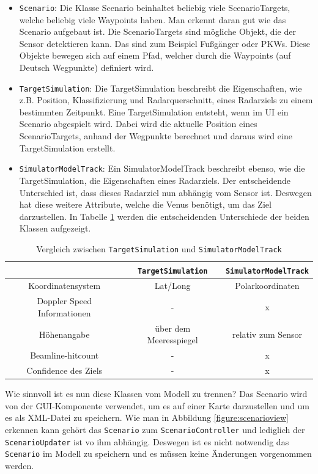 \begin{itemize}
    \item \texttt{Scenario}: Die Klasse Scenario beinhaltet beliebig viele ScenarioTargets, welche beliebig viele Waypoints haben. Man erkennt daran gut wie das Scenario aufgebaut ist. Die ScenarioTargets sind mögliche Objekt, die der Sensor detektieren kann. Das sind zum Beispiel Fußgänger oder PKWs. Diese Objekte bewegen sich auf einem Pfad, welcher durch die Waypoints (auf Deutsch Wegpunkte) definiert wird.
    \item \texttt{TargetSimulation}:  Die TargetSimulation beschreibt die Eigenschaften, wie z.B. Position, Klassifizierung und Radarquerschnitt, eines Radarziels zu einem bestimmten Zeitpunkt. Eine TargetSimulation entsteht, wenn im UI ein Scenario abgespielt wird. Dabei wird die aktuelle Position eines ScenarioTargets, anhand der Wegpunkte berechnet und daraus wird eine TargetSimulation erstellt.
    \item \texttt{SimulatorModelTrack}: Ein SimulatorModelTrack beschreibt ebenso, wie die TargetSimulation, die Eigenschaften eines Radarziels. Der entscheidende Unterschied ist, dass dieses Radarziel nun abhängig vom Sensor ist. Deswegen hat diese weitere Attribute, welche die Venus benötigt, um das Ziel darzustellen. In Tabelle \ref{table:1} werden die entscheidenden Unterschiede der beiden Klassen aufgezeigt.    
\end{itemize}

\begin{table}[h]
    \begin{tabular}{ |c|c|c| } 
        \hline
         & \texttt{TargetSimulation} & \texttt{SimulatorModelTrack} \\ 
        \hline
        Koordinatensystem & Lat/Long & Polarkoordinaten \\ 
        \hline
        Doppler Speed Informationen & - & x \\ 
        \hline
        Höhenangabe & über dem Meeresspiegel & relativ zum Sensor \\ 
        \hline
        Beamline-hitcount & - & x \\ 
        \hline
        Confidence des Ziels & - & x \\ 
        \hline        
   \end{tabular}
   \caption{Vergleich zwischen \texttt{TargetSimulation} und \texttt{SimulatorModelTrack}}
   \label{table:1}
\end{table}

Wie sinnvoll ist es nun diese Klassen vom Modell zu trennen? Das Scenario wird von der GUI-Komponente verwendet, um es auf einer Karte darzustellen und um es als XML-Datei zu speichern. Wie man in Abbildung \ref{figure:scenarioview} erkennen kann gehört das \texttt{Scenario} zum \texttt{ScenarioController} und lediglich der \texttt{ScenarioUpdater} ist vo ihm abhängig. Deswegen ist es nicht notwendig das \texttt{Scenario} im Modell zu speichern und es müssen keine Änderungen vorgenommen werden.

